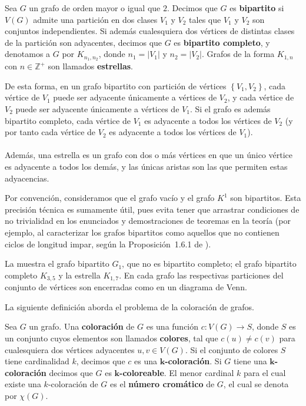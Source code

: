 \begin{Def}
   Sea $G$ un grafo de orden mayor o igual que $2$. Decimos que $G$ es \textbf{bipartito} si $V(G)$ admite una partición en dos clases $V_1$ y $V_2$ tales que $V_1$ y $V_2$ son conjuntos independientes. Si además cualesquiera dos vértices de distintas clases de la partición son adyacentes, decimos que $G$ es \textbf{bipartito completo}, y denotamos a $G$ por $K_{n_1,n_2}$, donde $n_1=|V_1|$ y $n_2=|V_2|$. Grafos de la forma $K_{1,n}$ con $n\in \mathbb{Z}^+$ son llamados \textbf{estrellas}.
\end{Def}
De esta forma, en un grafo bipartito con partición de vértices $\left\lbrace V_1,V_2\right\rbrace$, cada vértice de $V_1$ puede ser adyacente únicamente a vértices de $V_2$, y cada vértice de $V_2$ puede ser adyacente únicamente a vértices de $V_1$. Si el grafo es además bipartito completo, cada vértice de $V_1$ es adyacente a todos los vértices de $V_2$ (y por tanto cada vértice de $V_2$ es adyacente a todos los vértices de $V_1$).\\\\
Además, una estrella es un grafo con dos o más vértices en que un único vértice es adyacente a todos los demás, y las únicas aristas son las que permiten estas adyacencias.
\begin{Obs}
    Por convención, consideramos que el grafo vacío y el grafo $K^1$ son bipartitos. Esta precisión técnica es sumamente útil, pues evita tener que arrastrar condiciones de no trivialidad en los enunciados y demostraciones de teoremas en la teoría (por ejemplo, al caracterizar los grafos bipartitos como aquellos que no contienen ciclos de longitud impar, según la Proposición~1.6.1 de \cite{diestel2017}).
\end{Obs}
\begin{Ejm}
   La  muestra el grafo bipartito $G_1$, que no es bipartito completo; el grafo bipartito completo $K_{3,5}$ y la estrella $K_{1,7}$. En cada grafo las respectivas particiones del conjunto de vértices son encerradas como en un diagrama de Venn.
   
\end{Ejm}
La siguiente definición aborda el problema de la coloración de grafos.
\begin{Def}
   Sea $G$ un grafo. Una \textbf{coloración} de $G$ es una función $c: V(G) \to S$, donde $S$ es un conjunto cuyos elementos son llamados \textbf{colores}, tal que $c(u) \neq c(v)$ para cualesquiera dos vértices adyacentes $u, v \in V(G)$. Si el conjunto de colores $S$ tiene cardinalidad $k$, decimos que $c$ es una \textbf{$\bm{k}$-coloración}. Si $G$ tiene una \textbf{$\bm{k}$-coloración} decimos que $G$ es \textbf{$\bm{k}$-coloreable}. El menor cardinal $k$ para el cual existe una $k$-coloración de $G$ es el \textbf{número cromático} de $G$, el cual se denota por $\chi(G)$.
\end{Def}
